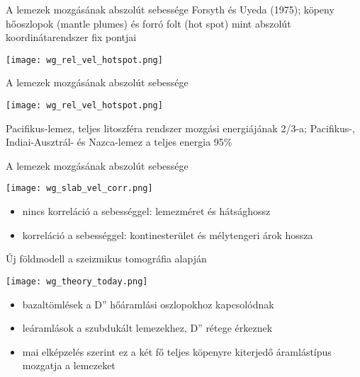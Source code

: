 \begin{frame}{A lemezek mozgásának abszolút sebessége}
    Forsyth és Uyeda (1975); köpeny hőoszlopok (mantle plumes) és forró folt (hot spot) mint abszolút koordinátarendszer fix pontjai
    
    \begin{center}
        \texttt{[image: wg\_rel\_vel\_hotspot.png]}
    \end{center}
\end{frame}


\begin{frame}{A lemezek mozgásának abszolút sebessége}
    \begin{center}
        \texttt{[image: wg\_rel\_vel\_hotspot.png]}
    \end{center}
    Pacifikus-lemez, teljes litoszféra rendszer mozgási energiájának 2/3-a; Pacifikus-, Indiai-Ausztrál- és Nazca-lemez a teljes energia 95\%
\end{frame}


\begin{frame}{A lemezek mozgásának abszolút sebessége}
    \begin{center}
        \texttt{[image: wg\_slab\_vel\_corr.png]}
    \end{center}
    \begin{itemize}
        \item nincs korreláció a sebességgel: lemezméret és hátsághossz
        \item korreláció a sebességgel: kontinesterület és mélytengeri árok hossza
    \end{itemize}
\end{frame}


\begin{frame}{Új földmodell a szeizmikus tomográfia alapján}
    \begin{center}
        \texttt{[image: wg\_theory\_today.png]}
    \end{center}
    \begin{itemize}
        \item bazaltömlések a D'' hőáramlási oszlopokhoz kapcsolódnak
        \item leáramlások a szubdukált lemezekhez, D'' rétege érkeznek
        \item mai elképzelés szerint ez a két fő teljes köpenyre kiterjedő áramlástípus mozgatja a lemezeket
    \end{itemize}
\end{frame}
